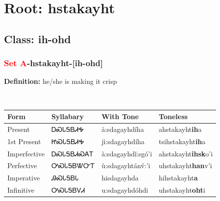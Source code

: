 \needspace{4in}
\section*{Root: hstakayht}
\nopagebreak
{}
\needspace{3in}
\subsection*{Class: ih-ohd}
\nopagebreak
\needspace{2in}
\subsubsection*{\textcolor{Red}{Set A}{-}\textbf{hstakayht}{-}[ih-ohd]}
\nopagebreak
\textbf{Definition: } he/she is making it crisp
\\[0.5em]
\begin{tabularx}{\textwidth}{l X X X}%
\toprule%
\textbf{Form}&\textbf{Syllabary}&\textbf{With Tone}&\textbf{Toneless}\\%
\midrule%
Present&ᎠᏍᏓᎦᏴᏗᎭ&à:sdagayhdíha&ahstakayht\textbf{ih}a\\%
1st Present&ᏥᏍᏓᎦᏴᏗᎭ&jì:sdagayhdíha&tsihstakayht\textbf{ih}a\\%
Imperfective&ᎠᏍᏓᎦᏴᏗᏍᎪᎢ&à:sdagayhdǐ:sgó’i&ahstakayht\textbf{ihsk}o'i\\%
Perfective&ᎤᏍᏓᎦᏴᏔᏅᎢ&ù:sdagayhtánv́:’i&uhstakayht\textbf{han}v'i\\%
Imperative&ᎯᏍᏓᎦᏴᏓ&hisdagayhda&hihstakayht\textbf{a}\\%
Infinitive&ᎤᏍᏓᎦᏴᏙᏗ&u:sdagayhdóhdi&uhstakayht\textbf{oht}i\\%
\bottomrule%
\end{tabularx}
\\[1em]